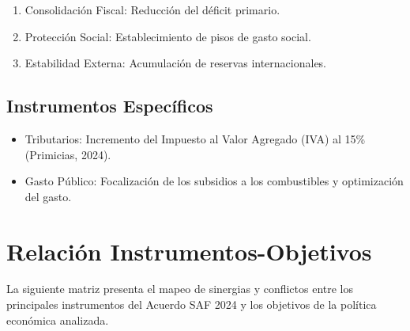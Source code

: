 \documentclass[12pt,spanish]{article}
\providecommand{\tightlist}{%
  \setlength{\itemsep}{0pt}\setlength{\parskip}{0pt}}
\begin{document}
\begin{enumerate}
\def\labelenumi{\arabic{enumi}.}
\tightlist
\item
  Consolidación Fiscal: Reducción del déficit primario.
\item
  Protección Social: Establecimiento de pisos de gasto social.
\item
  Estabilidad Externa: Acumulación de reservas internacionales.
\end{enumerate}

\subsection{Instrumentos Específicos}\label{instrumentos-especuxedficos}

\begin{itemize}
\tightlist
\item
  Tributarios: Incremento del Impuesto al Valor Agregado (IVA) al 15\%
  (Primicias, 2024).
\item
  Gasto Público: Focalización de los subsidios a los combustibles y
  optimización del gasto.
\end{itemize}

\section{Relación
Instrumentos-Objetivos}\label{relaciuxf3n-instrumentos-objetivos}

La siguiente matriz presenta el mapeo de sinergias y conflictos entre
los principales instrumentos del Acuerdo SAF 2024 y los objetivos de la
política económica analizada.
\end{document}
